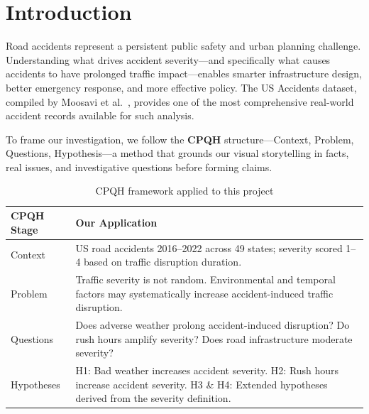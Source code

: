 
\section{Introduction}

Road accidents represent a persistent public safety and urban planning challenge.
Understanding what drives accident severity---and specifically what causes
accidents to have prolonged traffic impact---enables smarter infrastructure
design, better emergency response, and more effective policy.
The US Accidents dataset, compiled by Moosavi et al.\ \cite{moosavi2019dataset},
provides one of the most comprehensive real-world accident records available for
such analysis.

To frame our investigation, we follow the \textbf{CPQH} structure---Context,
Problem, Questions, Hypothesis---a method that grounds our visual storytelling in
facts, real issues, and investigative questions before forming claims.

\begin{table}[H]
\centering
\begin{tabularx}{\linewidth}{@{} l X @{}}
  \toprule
  \textbf{CPQH Stage} & \textbf{Our Application} \\ \midrule
  Context
    & US road accidents 2016--2022 across 49 states; severity scored 1--4
      based on traffic disruption duration. \\[4pt]
  Problem
    & Traffic severity is not random. Environmental and temporal factors may
      systematically increase accident-induced traffic disruption. \\[4pt]
  Questions
    & Does adverse weather prolong accident-induced disruption?
      Do rush hours amplify severity?
      Does road infrastructure moderate severity? \\[4pt]
  Hypotheses
    & H1: Bad weather increases accident severity.
      H2: Rush hours increase accident severity.
      H3 \& H4: Extended hypotheses derived from the severity definition. \\
  \bottomrule
\end{tabularx}
\caption{CPQH framework applied to this project}
\end{table}
